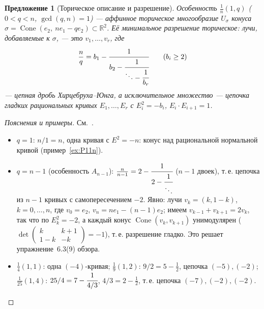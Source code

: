 \documentclass[11pt,a4paper]{article}
\theoremstyle{plain}
\newtheorem{proposition}[theorem]{Предложение}
\theoremstyle{definition}
\theoremstyle{remark}
\newcommand{\R}{\mathbb{R}}
\DeclareMathOperator{\Cone}{Cone}
\begin{document}
\begin{proposition}[Торическое описание и разрешение]\label{prop:HJ}
Особенность $\frac1n(1,q)$ \textup{(}$0<q<n$, $\gcd(q,n)=1$\textup{)} --- аффинное торическое многообразие
$U_\sigma$ конуса $\sigma=\Cone(e_2,\ ne_1-qe_2)\subset\R^2$. Её минимальное разрешение торическое:
лучи, добавляемые к $\sigma$, --- это $v_1,\dots,v_r$, где
\[
\frac nq=b_1-\cfrac1{b_2-\cfrac1{\ddots-\cfrac1{b_r}}}\qquad(b_i\ge2)
\]
--- \emph{цепная дробь Хирцебруха--Юнга}, а исключительное множество --- цепочка гладких
рациональных кривых $E_1,\dots,E_r$ с $E_i^2=-b_i$, $E_i\cdot E_{i+1}=1$.
\end{proposition}
\begin{proof}[Пояснения и примеры]
См.~\cite[10.2]{CLS}.
\begin{itemize}
\item $q=1$: $n/1=n$, одна кривая с $E^2=-n$: конус над рациональной нормальной кривой
(пример~\ref{ex:P11n}).
\item $q=n-1$ (особенность $A_{n-1}$): $\frac n{n-1}=2-\cfrac1{2-\cfrac1{\ddots}}$ ($n-1$ двоек),
т.\,е. цепочка из $n-1$ кривых с самопересечением $-2$. Явно: лучи $v_k=(k,1-k)$, $k=0,\dots,n$,
где $v_0=e_2$, $v_n=ne_1-(n-1)e_2$; имеем $v_{k-1}+v_{k+1}=2v_k$, так что по
\cite[\S\,10.4]{CLS} $E_k^2=-2$, а каждый конус $\Cone(v_{k},v_{k+1})$ унимодулярен
($\det\begin{pmatrix}k&k+1\\1-k&-k\end{pmatrix}=-1$), т.\,е. разрешение гладко. Это решает
упражнение~6.3(9) обзора.
\item $\frac14(1,1)$: одна $(-4)$-кривая; $\frac19(1,2)$: $9/2=5-\frac12$, цепочка $(-5),(-2)$;
$\frac1{25}(1,4)$: $25/4=7-\cfrac1{4/3}$, $4/3=2-\frac12$, т.\,е.
цепочка $(-7),(-2),(-2)$.
\end{itemize}
\end{proof}
\end{document}
